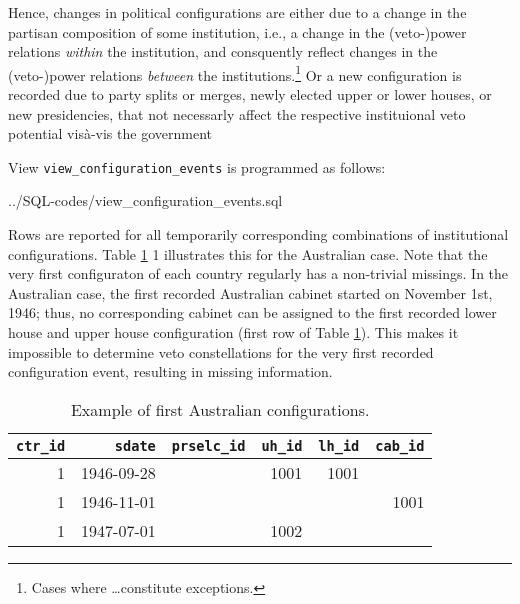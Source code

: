 Hence, changes in political configurations are either due to a change in the partisan composition of some institution, i.e., a change in the (veto-)power relations \emph{within} the institution, and consquently reflect changes in the (veto-)power relations \emph{between} the institutions.\footnote{Cases where \ldots constitute exceptions.}
Or a new configuration is recorded due to party splits or merges, newly elected upper or lower houses, or new presidencies, that not necessarly affect the respective instituional veto potential vis\`a-vis the government

View \texttt{view\_configuration\_events} is programmed as follows:

%
{../SQL-codes/view_configuration_events.sql}

Rows are reported for all temporarily corresponding combinations of institutional configurations. 
Table \ref{tab_example1_australian_configs} 1 illustrates this for the Australian case.
Note that the very first configuraton of each country regularly has a non-trivial missings.
In the Australian case, the first recorded Australian cabinet started on November 1st, 1946; thus, no corresponding cabinet can be assigned to the first recorded lower house and upper house configuration (first row of Table \ref{tab_example1_australian_configs}). 
This makes it impossible to determine veto constellations for the very first recorded configuration event, resulting in missing information.

\begin{table}[h!]
\centering\footnotesize
\caption{Example of first Australian configurations.}
\label{tab_example1_australian_configs}
\begin{tabular}{r r r r r r}
\tabularnewline\toprule
\multicolumn{1}{r}{\texttt{\smallfont ctr\_id}}	&
\multicolumn{1}{r}{\texttt{\smallfont sdate}}	&	
\multicolumn{1}{r}{\texttt{\smallfont prselc\_id}}	&
\multicolumn{1}{r}{\texttt{\smallfont uh\_id}}	&
\multicolumn{1}{r}{\texttt{\smallfont lh\_id}}	&	
\multicolumn{1}{r}{\texttt{\smallfont cab\_id}}	\\\midrule 
1	& 1946-09-28	&	& 1001	& 1001	& 		\\
1	& 1946-11-01	& 	& 		& 		& 1001 	\\
1	& 1947-07-01	&	& 1002	&		&		\\\bottomrule
\end{tabular}
\end{table}

